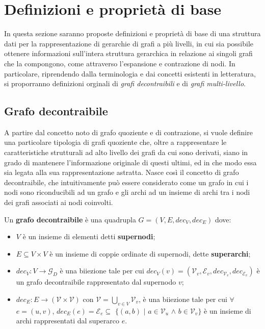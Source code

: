 \section{Definizioni e propriet\`a di base}\label{sec:definizioni-e-proprieta-di-base}

In questa sezione saranno proposte definizioni e propriet\`a di base di una struttura dati per la rappresentazione
di gerarchie di grafi a pi\`u livelli, in cui sia possibile ottenere informazioni sull'intera struttura gerarchica in
relazione ai singoli grafi che la compongono, come attraverso l'espansione e contrazione di nodi.
In particolare, riprendendo dalla terminologia e dai concetti esistenti in letteratura, si proporranno definizioni
orginali di \textit{grafi decontraibili} e di \textit{grafi multi-livello}.

\subsection{Grafo decontraibile}

A partire dal concetto noto di grafo quoziente e di contrazione, si vuole definire una particolare
tipologia di grafi quoziente che, oltre a rappresentare le caratteristiche strutturali ad alto livello
dei grafi da cui sono derivati, siano in grado di mantenere l'informazione originale di questi ultimi, ed in
che modo essa sia legata alla sua rappresentazione astratta. \newline
Nasce così il concetto di grafo decontraibile, che intuitivamente pu\`o essere considerato come un grafo
in cui i nodi sono riconducibili ad un grafo e gli archi ad un insieme di archi tra i nodi dei grafi
associati ai nodi coinvolti.
\newpage

\begin{definition}
    Un \textbf{grafo decontraibile} \`e una quadrupla $G = (V, E, dec_V, dec_E)$ dove:
    \begin{itemize}
        \item $V$ \`e un insieme di elementi detti \textbf{supernodi};
        \item $E \subseteq V \times V$ \`e un insieme di coppie ordinate di supernodi, dette \textbf{superarchi};
        \item $dec_V : V \rightarrow \mathcal{G}_D$ \`e una biiezione tale per cui $dec_V(v) = (\mathcal{V}_v,
            \mathcal{E}_v, dec_{\mathcal{V}_v}, dec_{\mathcal{E}_v})$ \`e un grafo decontraibile rappresentato
            dal supernodo $v$;
        \item $dec_E : E \rightarrow (\mathcal{V} \times \mathcal{V})$ con $\mathcal{V} = \bigcup_{v \in V}\mathcal{V}_v$,
            \`e una biiezione tale per cui $\forall$ $ e = (u, v)$, $dec_E(e) = \mathcal{E}_e \subseteq$ $\{(a, b)$ $\mid$ $a \in \mathcal{V}_u$ $\wedge$
            $b \in \mathcal{V}_v\}$ \`e un insieme di archi rappresentati dal superarco $e$.
    \end{itemize}
\end{definition}

